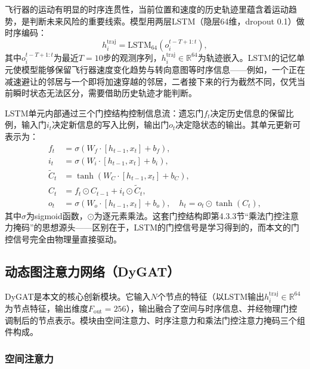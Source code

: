 \documentclass[12pt,a4paper,UTF8]{ctexart}
\begin{document}
飞行器的运动有明显的时序连贯性，当前位置和速度的历史轨迹里蕴含着运动趋势，是判断未来风险的重要线索。模型用两层LSTM（隐层64维，dropout 0.1）做时序编码：
\begin{equation}
    h_i^{\text{traj}} = \text{LSTM}_{64}(o_i^{t-T+1:t}),
    \label{eq:lstm}
\end{equation}
其中$o_i^{t-T+1:t}$为最近$T=10$步的观测序列，$h_i^{\text{traj}}\in\mathbb{R}^{64}$为轨迹嵌入。LSTM的记忆单元使模型能够保留飞行器速度变化趋势与转向意图等时序信息——例如，一个正在减速避让的邻居与一个即将加速穿越的邻居，二者接下来的行为截然不同，仅凭当前瞬时状态无法区分，需要借助历史轨迹才能判断。

LSTM单元内部通过三个门控结构控制信息流：遗忘门$f_t$决定历史信息的保留比例，输入门$i_t$决定新信息的写入比例，输出门$o_t$决定隐状态的输出。其单元更新可表示为：
\begin{align}
f_t &= \sigma(W_f\cdot[h_{t-1},x_t]+b_f),\\
i_t &= \sigma(W_i\cdot[h_{t-1},x_t]+b_i),\\
\tilde{C}_t &= \tanh(W_C\cdot[h_{t-1},x_t]+b_C),\\
C_t &= f_t\odot C_{t-1} + i_t\odot\tilde{C}_t,\\
o_t &= \sigma(W_o\cdot[h_{t-1},x_t]+b_o),\quad h_t = o_t\odot\tanh(C_t),
\end{align}
其中$\sigma$为sigmoid函数，$\odot$为逐元素乘法。这套门控结构即第4.3.3节“乘法门控注意力掩码”的思想源头——区别在于，LSTM的门控信号是学习得到的，而本文的门控信号完全由物理量直接驱动。

\subsection{动态图注意力网络（DyGAT）}

DyGAT是本文的核心创新模块。它输入$N$个节点的特征（以LSTM输出$h_i^{\text{traj}}\in\mathbb{R}^{64}$为节点特征，输出维度$F_{\text{out}}=256$），输出融合了空间与时序信息、并经物理门控调制后的节点表示。模块由空间注意力、时序注意力和乘法门控注意力掩码三个组件构成。

\subsubsection{空间注意力}
\end{document}
